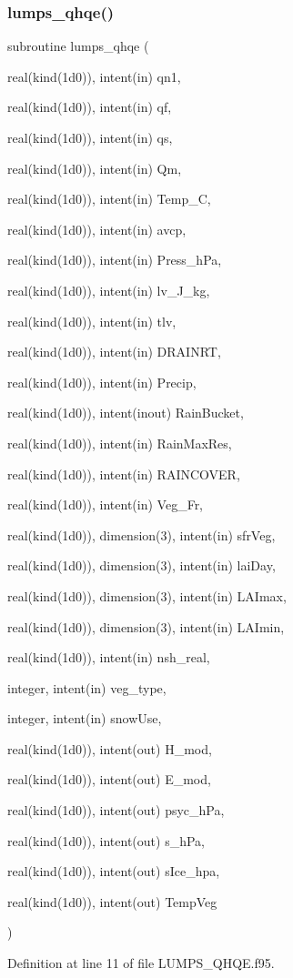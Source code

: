 \subsubsection{\texorpdfstring{lumps\+\_\+qhqe()}{lumps\_qhqe()}}
{\footnotesize\ttfamily subroutine lumps\+\_\+qhqe (\begin{DoxyParamCaption}\item[{real(kind(1d0)), intent(in)}]{qn1,  }\item[{real(kind(1d0)), intent(in)}]{qf,  }\item[{real(kind(1d0)), intent(in)}]{qs,  }\item[{real(kind(1d0)), intent(in)}]{Qm,  }\item[{real(kind(1d0)), intent(in)}]{Temp\+\_\+C,  }\item[{real(kind(1d0)), intent(in)}]{avcp,  }\item[{real(kind(1d0)), intent(in)}]{Press\+\_\+h\+Pa,  }\item[{real(kind(1d0)), intent(in)}]{lv\+\_\+\+J\+\_\+kg,  }\item[{real(kind(1d0)), intent(in)}]{tlv,  }\item[{real(kind(1d0)), intent(in)}]{D\+R\+A\+I\+N\+RT,  }\item[{real(kind(1d0)), intent(in)}]{Precip,  }\item[{real(kind(1d0)), intent(inout)}]{Rain\+Bucket,  }\item[{real(kind(1d0)), intent(in)}]{Rain\+Max\+Res,  }\item[{real(kind(1d0)), intent(in)}]{R\+A\+I\+N\+C\+O\+V\+ER,  }\item[{real(kind(1d0)), intent(in)}]{Veg\+\_\+\+Fr,  }\item[{real(kind(1d0)), dimension(3), intent(in)}]{sfr\+Veg,  }\item[{real(kind(1d0)), dimension(3), intent(in)}]{lai\+Day,  }\item[{real(kind(1d0)), dimension(3), intent(in)}]{L\+A\+Imax,  }\item[{real(kind(1d0)), dimension(3), intent(in)}]{L\+A\+Imin,  }\item[{real(kind(1d0)), intent(in)}]{nsh\+\_\+real,  }\item[{integer, intent(in)}]{veg\+\_\+type,  }\item[{integer, intent(in)}]{snow\+Use,  }\item[{real(kind(1d0)), intent(out)}]{H\+\_\+mod,  }\item[{real(kind(1d0)), intent(out)}]{E\+\_\+mod,  }\item[{real(kind(1d0)), intent(out)}]{psyc\+\_\+h\+Pa,  }\item[{real(kind(1d0)), intent(out)}]{s\+\_\+h\+Pa,  }\item[{real(kind(1d0)), intent(out)}]{s\+Ice\+\_\+hpa,  }\item[{real(kind(1d0)), intent(out)}]{Temp\+Veg }\end{DoxyParamCaption})}



Definition at line 11 of file L\+U\+M\+P\+S\+\_\+\+Q\+H\+Q\+E.\+f95.

